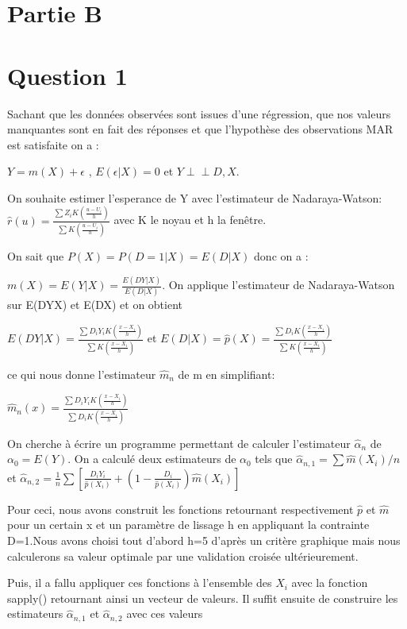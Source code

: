 \documentclass[
]{article}
\begin{document}
\hypertarget{partie-b}{%
\section{Partie B}\label{partie-b}}

\hypertarget{question-1-1}{%
\section{Question 1}\label{question-1-1}}

Sachant que les données observées sont issues d'une régression, que nos
valeurs manquantes sont en fait des réponses et que l'hypothèse des
observations MAR est satisfaite on a :

\(Y=m(X)+\epsilon\) , \(E( \epsilon |X)=0\) et
\(Y {\perp \!\!\! \perp}D,X\).

On souhaite estimer l'esperance de Y avec l'estimateur de
Nadaraya-Watson:
\(\hat r(u)=\frac{\sum Z_iK(\frac{u-U_i}{h})}{\sum K(\frac{u-U_i}{h})}\)
avec K le noyau et h la fenêtre.

On sait que \(P(X)=P(D=1|X)=E(D|X)\) donc on a :

\(m(X)=E(Y|X)=\frac {E(DY|X)}{E(D|X)}\). On applique l'estimateur de
Nadaraya-Watson sur E(DY\textbar X) et E(D\textbar X) et on obtient

\(E(DY|X)=\frac{\sum D_i Y_i K(\frac {x-X_i}{h})}{\sum K(\frac {x-X_i}{h})}\)
et
\(E(D|X)=\hat p(X)=\frac{\sum D_i K(\frac {x-X_i}{h})}{\sum K(\frac {x-X_i}{h})}\)

ce qui nous donne l'estimateur \(\hat m_n\) de m en simplifiant:

\(\hat m_n(x)=\frac{\sum D_i Y_i K(\frac {x-X_i}{h})}{\sum D_iK(\frac {x-X_i}{h})}\)

On cherche à écrire un programme permettant de calculer l'estimateur
\(\hat \alpha_n\) de \(\alpha_0 =E(Y)\). On a calculé deux estimateurs
de \(\alpha_0\) tels que \(\hat \alpha_{n,1}= \sum \hat m(X_i)/n\) et
\(\hat \alpha_{n,2}= \frac {1}{n}\sum [\frac{D_i Y_i}{\hat p(X_i)}+(1-\frac {D_i}{\hat p(X_i)})\hat m(X_i)]\)

Pour ceci, nous avons construit les fonctions retournant respectivement
\(\hat p\) et \(\hat m\) pour un certain x et un paramètre de lissage h
en appliquant la contrainte D=1.Nous avons choisi tout d'abord h=5
d'après un critère graphique mais nous calculerons sa valeur optimale
par une validation croisée ultérieurement.

Puis, il a fallu appliquer ces fonctions à l'ensemble des \(X_i\) avec
la fonction sapply() retournant ainsi un vecteur de valeurs. Il suffit
ensuite de construire les estimateurs \(\hat\alpha_{n,1}\) et
\(\hat \alpha_{n,2}\) avec ces valeurs
\end{document}
